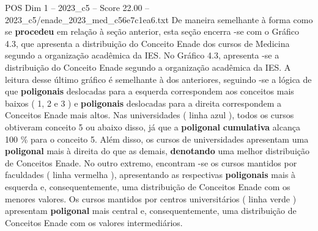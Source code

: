\begin{textsample}{POS Dim 1 – 2023\_c5 – Score 22.00 – 2023\_c5/enade\_2023\_med\_c56e7c1ea6.txt}
De maneira semelhante à forma como se \textbf{procedeu} em relação à seção anterior, esta seção encerra -se com o Gráfico 4.3, que apresenta a distribuição do Conceito Enade dos cursos de Medicina segundo a organização acadêmica da IES.
No Gráfico 4.3, apresenta -se a distribuição do Conceito Enade segundo a organização acadêmica da IES.
A leitura desse último gráfico é semelhante à dos anteriores, seguindo -se a lógica de que \textbf{poligonais} deslocadas para a esquerda correspondem aos conceitos mais baixos ( 1, 2 e 3 ) e \textbf{poligonais} deslocadas para a direita correspondem a Conceitos Enade mais altos.
Nas universidades ( linha azul ), todos os cursos obtiveram conceito 5 ou abaixo disso, já que a \textbf{poligonal} \textbf{cumulativa} alcança 100 \% para o conceito 5.
Além disso, os cursos de universidades apresentam uma \textbf{poligonal} mais à direita do que as demais, \textbf{denotando} uma melhor distribuição de Conceitos Enade.
No outro extremo, encontram -se os cursos mantidos por faculdades ( linha vermelha ), apresentando as respectivas \textbf{poligonais} mais à esquerda e, consequentemente, uma distribuição de Conceitos Enade com os menores valores.
Os cursos mantidos por centros universitários ( linha verde ) apresentam \textbf{poligonal} mais central e, consequentemente, uma distribuição de Conceitos Enade com os valores intermediários.

\end{textsample}
